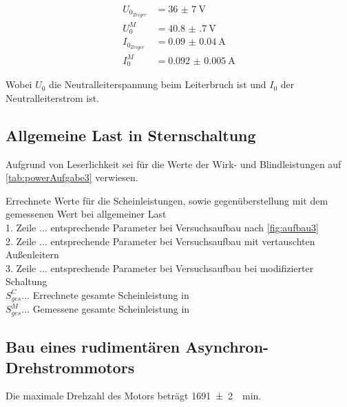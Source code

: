 \documentclass[12pt,english,ngerman]{scrartcl}
\begin{document}
\begin{align*}
	U_{0_{Zeiger}} & = \SI{36(7)}{\volt}      \\
	U_{0}^M        & = \SI{40.8(7)}{\volt}    \\
	I_{0_{Zeiger}} & = \SI{0.09(4)}{\ampere}  \\
	I_{0}^M        & = \SI{0.092(5)}{\ampere}
\end{align*}

Wobei $U_0$ die Neutralleiterspannung beim Leiterbruch ist und $I_0$ der
Neutralleiterstrom ist.

\subsection{Allgemeine Last in Sternschaltung}

Aufgrund von Leserlichkeit sei für die Werte der Wirk- und Blindleistungen auf
\autoref{tab:powerAufgabe3} verwiesen.

\begin{table}[H]
	\caption[Errechnete Werte für die Scheinleistungen bei allgemeiner Last] { Errechnete
		Werte für die Scheinleistungen, sowie gegenüberstellung mit dem gemessenen Wert
		bei allgemeiner Last                                            \\
		1. Zeile $\dots$ entsprechende Parameter bei Versuchsaufbau nach
		\autoref{fig:aufbau3}                                           \\
		2. Zeile $\dots$ entsprechende Parameter bei Versuchsaufbau mit vertauschten
		Außenleitern                                                    \\
		3. Zeile $\dots$ entsprechende Parameter bei Versuchsaufbau bei modifizierter
		Schaltung                                                       \\
		$S_{ges}^C \dots$ Errechnete gesamte Scheinleistung in \si{\VA} \\
		$S_{ges}^M \dots$ Gemessene gesamte Scheinleistung in \si{\VA}  \\
	}
	\centering
	
\end{table}

\subsection{Bau eines rudimentären Asynchron-Drehstrommotors}

Die maximale Drehzahl des Motors beträgt \SI{1691(2)}{\per\minute}.

\newpage

\printbibliography
\listoffigures
\listoftables
\end{document}
